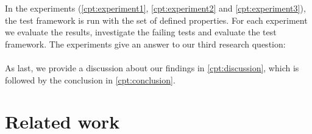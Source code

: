 In the experiments (\autoref{cpt:experiment1}, \autoref{cpt:experiment2} and
\autoref{cpt:experiment3}), the test framework is run with the set of defined
properties. For each experiment we evaluate the results, investigate the failing
tests and evaluate the test framework. The experiments give an answer to our
third research question:\rqThree\\
\\
As last, we provide a discussion about our findings in \autoref{cpt:discussion},
which is followed by the conclusion in \autoref{cpt:conclusion}.


\section{Related work}

